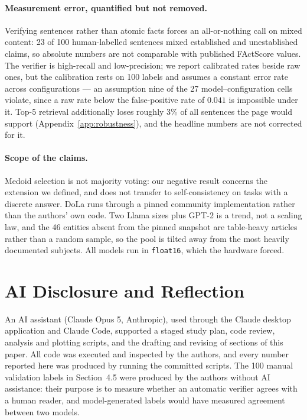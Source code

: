 \documentclass[11pt]{article}
\begin{document}
\paragraph{Measurement error, quantified but not removed.} Verifying sentences
rather than atomic facts forces an all-or-nothing call on mixed content: 23 of
100 human-labelled sentences mixed established and unestablished claims, so
absolute numbers are not comparable with published FActScore values. The
verifier is high-recall and low-precision; we report calibrated rates beside
raw ones, but the calibration rests on 100 labels and assumes a constant error
rate across configurations --- an assumption nine of the 27
model--configuration cells violate, since a raw rate below the false-positive
rate of $0.041$ is impossible under it. Top-5 retrieval additionally loses roughly 3\% of
all sentences the page would support (Appendix~\ref{app:robustness}), and the
headline numbers are not corrected for it.

\paragraph{Scope of the claims.} Medoid selection is not majority voting: our
negative result concerns the extension we defined, and does not transfer to
self-consistency on tasks with a discrete answer. DoLa runs through a pinned
community implementation rather than the authors' own code. Two Llama sizes
plus GPT-2 is a trend, not a scaling law, and the 46 entities absent from the
pinned snapshot are table-heavy articles rather than a random sample, so the
pool is tilted away from the most heavily documented subjects. All models run
in \texttt{float16}, which the hardware forced.

\section*{AI Disclosure and Reflection}

An AI assistant (Claude Opus 5, Anthropic), used through the Claude desktop
application and Claude Code, supported a staged study plan, code review,
analysis and plotting scripts, and the drafting and revising of sections of
this paper. All code was executed and inspected by the authors, and every
number reported here was produced by running the committed scripts. The 100
manual validation labels in Section~4.5 were produced by the authors without AI
assistance: their purpose is to measure whether an automatic verifier agrees
with a human reader, and model-generated labels would have measured agreement
between two models.
\end{document}
